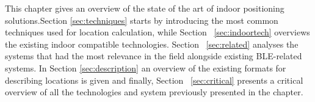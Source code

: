 \label{cap:indoor}

This chapter gives an overview of the state of the art of indoor positioning solutions.Section \ref{sec:techniques} starts by introducing the most common techniques used for location calculation, while Section ~\ref{sec:indoortech} overviews the existing indoor compatible technologies. Section ~\ref{sec:related} analyses the systems that had the most relevance in the field alongside existing \ac{BLE}-related systems. In Section \ref{sec:description} an overview of the existing formats for describing locations is given and finally, Section ~\ref{sec:critical} presents a critical overview of all the technologies and system previously presented in the chapter.






\cleardoublepage
